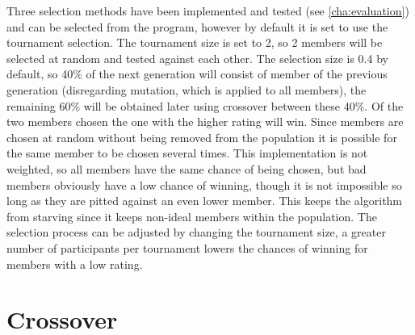 Three selection methods have been implemented and tested (see \ref{cha:evaluation}) and can be selected from the program, however by default it is set to use the tournament selection. The tournament size is set to 2, so 2 members will be selected at random and tested against each other. The selection size is 0.4 by default, so 40\% of the next generation will consist of member of the previous generation (disregarding mutation, which is applied to all members), the remaining 60\% will be obtained later using crossover between these 40\%. Of the two members chosen the one with the higher rating will win. Since members are chosen at random without being removed from the population it is possible for the same member to be chosen several times. This implementation is not weighted, so all members have the same chance of being chosen, but bad members obviously have a low chance of winning, though it is not impossible so long as they are pitted against an even lower member. This keeps the algorithm from starving since it keeps non-ideal members within the population. The selection process can be adjusted by changing the tournament size, a greater number of participants per tournament lowers the chances of winning for members with a low rating.

\section{Crossover} %
\label{sec:crossover}

